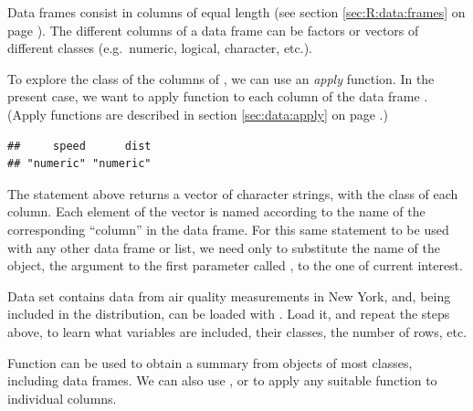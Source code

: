 \documentclass[krantz2]{krantz}\usepackage{knitr}%
\begin{document}
Data frames consist in columns of equal length (see section \ref{sec:R:data:frames} on page \pageref{sec:R:data:frames}). The different columns of a data frame can be factors or vectors of different classes (e.g.\ numeric, logical, character, etc.).

To explore the class of the columns of , we can use an \emph{apply} function. In the present case, we want to apply function  to each column of the data frame . (Apply functions are described in section \ref{sec:data:apply} on page \pageref{sec:data:apply}.)

\begin{knitrout}\footnotesize
{}\color{fgcolor}\begin{kframe}
\begin{alltt}
\hlstd{(}   
\end{alltt}
\begin{verbatim}
##     speed      dist 
## "numeric" "numeric"
\end{verbatim}
\end{kframe}
\end{knitrout}

The statement above returns a vector of character strings, with the class of each column. Each element of the vector is named according to the name of the corresponding ``column'' in the data frame. For this same statement to be used with any other data frame or list, we need only to substitute the name of the object, the argument to the first parameter called , to the one of current interest.

\begin{playground}
Data set  contains data from air quality measurements in New York, and, being included in the \Rpgrm distribution, can be loaded with . Load it, and repeat the steps above, to learn what variables are included, their classes, the number of rows, etc.
\end{playground}

Function  can be used to obtain a summary from objects of most \Rlang classes, including data frames. We can also use ,  or  to apply any suitable function to individual columns.
\end{document}
